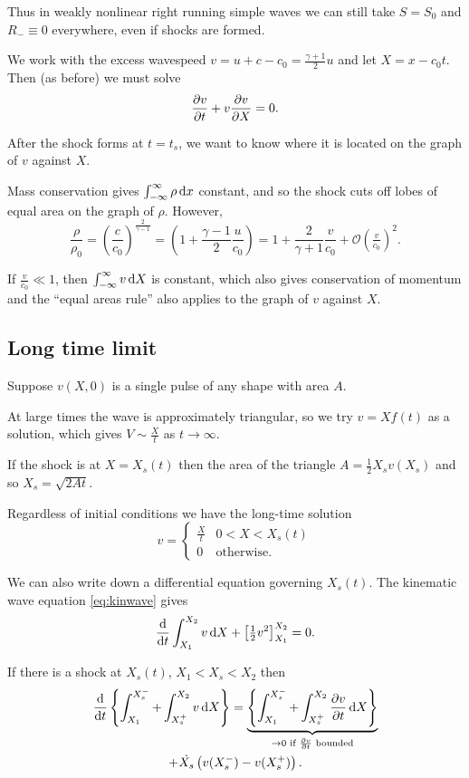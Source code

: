 \documentclass{notes}
\newcommand{\cO}{\mathcal{O}}
\begin{document}
Thus in weakly nonlinear right running simple waves we can still take
$S=S_0$ and $R_- \equiv 0$ everywhere, even if shocks are formed.

We work with the excess wavespeed $v = u + c - c_0 = \frac{\gamma+1}{2} u$
and let $X = x - c_0 t$.  Then (as before) we must solve
\[
\frac{\partial v}{\partial t} + v \frac{\partial v}{\partial X} = 0.
\]

After the shock forms at $t = t_s$, we want to know where it is located
on the graph of $v$ against $X$.

\vspace{1.5in}

Mass conservation gives $\int_{-\infty}^\infty \rho\, \mathrm{d} x$ constant,
and so the shock cuts off lobes of equal area on the graph of $\rho$.
However,
\[
\frac{\rho}{\rho_0} = \left( \frac{c}{c_0} \right)^{\frac{2}{\gamma-1}}
= \left( 1 + \frac{\gamma-1}{2} \frac{u}{c_0} \right) =
1+ \frac{2}{\gamma+1} \frac{v}{c_0} +\cO(\tfrac{v}{c_0})^2.
\]

If $\tfrac{v}{c_0} \ll 1$, then $\int_{-\infty}^\infty v\, \mathrm{d} X$ is
constant, which also gives conservation of momentum and the ``equal areas
rule'' also applies to the graph of $v$ against $X$.

\subsection{Long time limit}

Suppose $v(X,0)$ is a single pulse of any shape with area $A$.

\vspace{2in}

At large times the wave is approximately triangular, so we try
$v = Xf(t)$ as a solution, which gives $V \sim \tfrac{X}{t}$ as
$t \to \infty$.

If the shock is at $X = X_s(t)$ then the area of the triangle
$A = \tfrac{1}{2} X_s v(X_s)$ and so $X_s = \sqrt{2 A t}$.

Regardless of initial conditions we have the long-time solution
\[
v = \begin{cases}
\frac{X}{t} & 0 < X < X_s(t) \\
0 & \text{otherwise.}
\end{cases}
\]

We can also write down a differential equation governing $X_s(t)$.
The kinematic wave equation \eqref{eq:kinwave} gives
\[
\frac{\mathrm{d}}{\mathrm{d} t} \int_{X_1}^{X_2} v\, \mathrm{d} X
+ \left[ \tfrac{1}{2} v^2 \right]_{X_1}^{X_2} = 0.
\]

If there is a shock at $X_s(t)$, $X_1 < X_s < X_2$ then
\begin{multline*}
\frac{\mathrm{d}}{\mathrm{d} t} \left\{ \int_{X_1}^{X_s^-} + \int_{X_s^+}^{X_2}
v\, \mathrm{d} X \right\} = 
\underbrace{\left\{ \int_{X_1}^{X_s^-} + \int_{X_s^+}^{X_2}
\frac{\partial v}{\partial t} \, \mathrm{d} X \right\}}_{\to 0 \text{ if $\frac{\partial v}{\partial t}$ bounded}} \\
+ \dot{X_s} \left( v(X_s^-) - v(X_s^+) \right).
\end{multline*}
\end{document}

